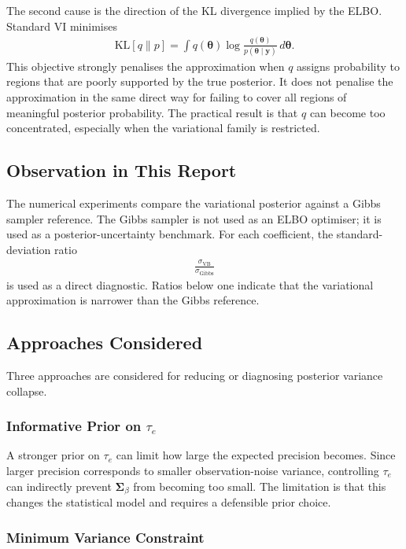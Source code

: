 \documentclass[11pt,a4paper]{article}
\begin{document}
The second cause is the direction of the KL divergence implied by the ELBO. Standard VI minimises
\begin{align}
\mathrm{KL}[q\|p] = \int q(\bm{\theta})\log\frac{q(\bm{\theta})}{p(\bm{\theta}\mid\bm{y})}\,d\bm{\theta}.
\end{align}
This objective strongly penalises the approximation when $q$ assigns probability to regions that are poorly supported by the true posterior. It does not penalise the approximation in the same direct way for failing to cover all regions of meaningful posterior probability. The practical result is that $q$ can become too concentrated, especially when the variational family is restricted.

\subsection{Observation in This Report}

The numerical experiments compare the variational posterior against a Gibbs sampler reference. The Gibbs sampler is not used as an ELBO optimiser; it is used as a posterior-uncertainty benchmark. For each coefficient, the standard-deviation ratio
\begin{align}
\frac{\sigma_{\mathrm{VB}}}{\sigma_{\mathrm{Gibbs}}}
\end{align}
is used as a direct diagnostic. Ratios below one indicate that the variational approximation is narrower than the Gibbs reference.

\subsection{Approaches Considered}

Three approaches are considered for reducing or diagnosing posterior variance collapse.

\subsubsection{Informative Prior on $\tau_e$}

A stronger prior on $\tau_e$ can limit how large the expected precision becomes. Since larger precision corresponds to smaller observation-noise variance, controlling $\tau_e$ can indirectly prevent $\bm{\Sigma}_\beta$ from becoming too small. The limitation is that this changes the statistical model and requires a defensible prior choice.

\subsubsection{Minimum Variance Constraint}
\end{document}
